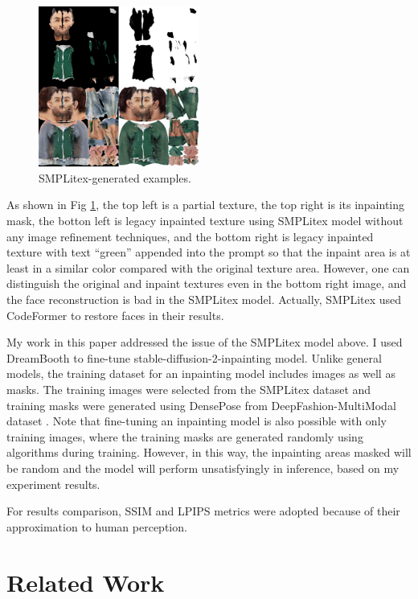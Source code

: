 \documentclass[acmtog]{acmart}
\begin{document}
\begin{figure}[h]
  \centering
  \includegraphics[width=0.47\textwidth]{figs/smplitex_sample.png}
  \caption{SMPLitex-generated examples.}
  \label{fig:smplitex_sample}
\end{figure}

As shown in Fig \ref{fig:smplitex_sample}, the top left is a partial texture, the top right is its inpainting mask, the botton left is legacy inpainted texture using SMPLitex model without any image refinement techniques, and the bottom right is legacy inpainted texture with text ``green'' appended into the prompt so that the inpaint area is at least in a similar color compared with the original texture area. However, one can distinguish the original and inpaint textures even in the bottom right image, and the face reconstruction is bad in the SMPLitex model. Actually, SMPLitex used CodeFormer \cite{zhou2022towards} to restore faces in their results.

My work in this paper addressed the issue of the SMPLitex model above. I used DreamBooth to fine-tune stable-diffusion-2-inpainting model. Unlike general models, the training dataset for an inpainting model includes images as well as masks. The training images were selected from the SMPLitex dataset and training masks were generated using DensePose from DeepFashion-MultiModal dataset \cite{jiang2022text2human}. Note that fine-tuning an inpainting model is also possible with only training images, where the training masks are generated randomly using algorithms during training. However, in this way, the inpainting areas masked will be random and the model will perform unsatisfyingly in inference, based on my experiment results.

For results comparison, SSIM and LPIPS metrics were adopted because of their approximation to human perception.

\section{Related Work}
\end{document}
